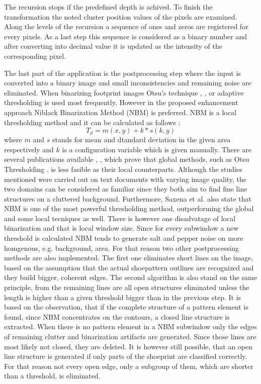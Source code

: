 \documentclass[draft,final]{vutinfth} %
\begin{document}
The recursion stops if the predefined depth is achived.
To finish the transformation the noted cluster position values of the pixels are examined.
Along the levels of the recursion a sequence of ones and zeros are registered for every pixels.
As a last step this sequence is considered as a binary number and after converting into decimal value it is updated as the intensity of the corresponding pixel.
\par
The last part of the application is the postprocessing step where the input is converted into a binary image and small inconsistencies and remaining noise are eliminated.
When binarizing footprint images Otsu's technique \cite{algarni2008novel}, \cite{alizadeh2017automatic}, \cite{wu2019crime} or adaptive thresholding \cite{wang2014automatic} is used most frequently.
However in the proposed enhancement approach Niblack Binarization Method (NBM) \cite{niblack1985introduction} is preferred.
NBM is a local thresholding method and it can be calculated as follows \cite{saxena2019niblack}:
\[T_d = m(x,y) + k * s(k, y)\]
where $m$ and $s$ stands for mean and dtandard deviation in the given area respectively and $k$ is a configuration variable which is given manually. 
There are several publications available \cite{som2011application}, \cite{athimethphat2011review}, which prove that global methods, such as Otsu Thresholding \cite{otsu1979threshold}, is less fasible as their local counterparts.
Although the studies mentioned were carried out on text documents with varying image quality, the two domains can be considered as familiar since they both aim to find fine line structures on a cluttered background.
Furthermore, Saxena et al. \cite{saxena2019niblack} also state that NBM is one of the most powerful thresholding method, outperforming the global and some local tecniques as well. 
There is however one disadvatage of local binarization and that is local window size.
Since for every subwindow a new threshold is calculated NBM tends to generate salt and pepper noise on more homgenous, e.g. background, area.
For that reason two other postprocessing methods are also implemented.
The first one eliminates short lines on the image, based on the assumption that the actual shoepattern outlines are recognized and they build bigger, coherent edges.
The second algorithm is also stand on the same principle, from the remaining lines are all open structures eliminated unless the length is higher than a given threshold bigger than in the previous step.
It is based on the observation, that if the complete structure of a pattern element is found, since NBM concentrates on the contours, a closed line structure is extracted.
When there is no pattern element in a NBM subwindow only the edges of remaining clutter and binarization artifacts are generated.
Since those lines are most likely not closed, they are deleted.
It is however still possible, that an open line structure is generated if only parts of the shoeprint are classified correctly.
For that reason not every open edge, only a subgroup of them, which are shorter than a threshold, is eliminated.
\end{document}
